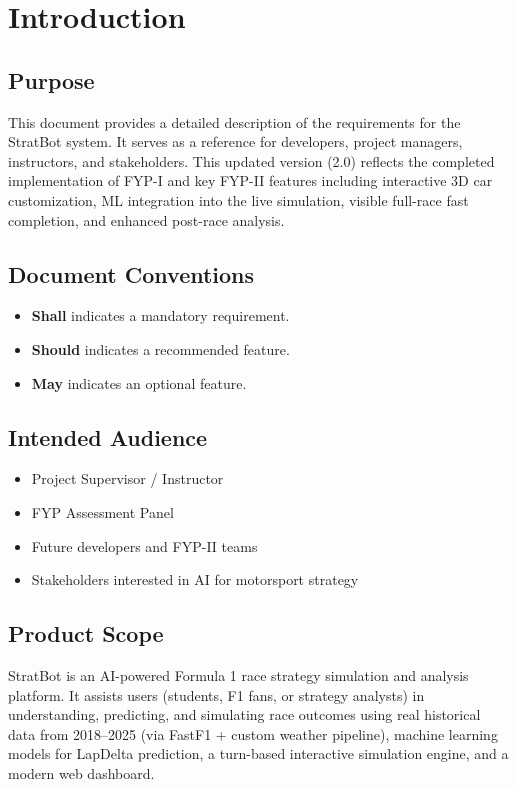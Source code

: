 \documentclass[12pt,a4paper]{article}
\begin{document}
\tableofcontents
\newpage

\section{Introduction}
\subsection{Purpose}
This document provides a detailed description of the requirements for the StratBot system. It serves as a reference for developers, project managers, instructors, and stakeholders. This updated version (2.0) reflects the completed implementation of FYP-I and key FYP-II features including interactive 3D car customization, ML integration into the live simulation, visible full-race fast completion, and enhanced post-race analysis.

\subsection{Document Conventions}
\begin{itemize}
\item \textbf{Shall} indicates a mandatory requirement.
\item \textbf{Should} indicates a recommended feature.
\item \textbf{May} indicates an optional feature.
\end{itemize}

\subsection{Intended Audience}
\begin{itemize}
\item Project Supervisor / Instructor
\item FYP Assessment Panel
\item Future developers and FYP-II teams
\item Stakeholders interested in AI for motorsport strategy
\end{itemize}

\subsection{Product Scope}
StratBot is an AI-powered Formula 1 race strategy simulation and analysis platform. It assists users (students, F1 fans, or strategy analysts) in understanding, predicting, and simulating race outcomes using real historical data from 2018--2025 (via FastF1 + custom weather pipeline), machine learning models for LapDelta prediction, a turn-based interactive simulation engine, and a modern web dashboard.
\end{document}
